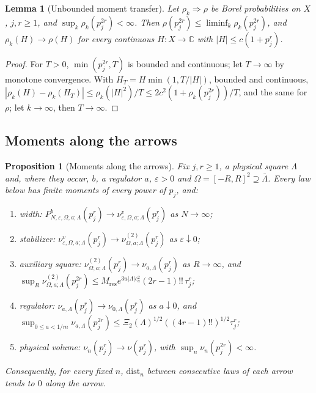 \documentclass[11pt]{article}
\theoremstyle{plain}
\newtheorem{proposition}[theorem]{Proposition}
\newtheorem{lemma}[theorem]{Lemma}
\theoremstyle{definition}
\theoremstyle{remark}
\newcommand{\C}{\mathbb{C}}
\newcommand{\dist}{\mathrm{dist}}
\begin{document}
\begin{lemma}[Unbounded moment transfer]\label{lem:transfer}
Let $\rho_k\Rightarrow\rho$ be Borel probabilities on $X$, $j,r\ge1$, and
$\sup_k\rho_k(p_j^{2r})<\infty$. Then $\rho(p_j^{2r})\le\liminf_k\rho_k(p_j^{2r})$, and
$\rho_k(H)\to\rho(H)$ for every continuous $H:X\to\C$ with $|H|\le c(1+p_j^{r})$.
\end{lemma}

\begin{proof}
For $T>0$, $\min(p_j^{2r},T)$ is bounded and continuous; let $T\to\infty$ by monotone
convergence. With $H_T=H\min(1,T/|H|)$, bounded and continuous,
$|\rho_k(H)-\rho_k(H_T)|\le\rho_k(|H|^{2})/T\le2c^{2}(1+\rho_k(p_j^{2r}))/T$, and the same for $\rho$; let
$k\to\infty$, then $T\to\infty$.
\end{proof}

\subsection{Moments along the arrows}

\begin{proposition}[Moments along the arrows]\label{prop:H1arrows}
Fix $j,r\ge1$, a physical square $\Lambda$ and, where they occur, $b$, a regulator $a$,
$\varepsilon>0$ and $\Omega=[-R,R]^{2}\supseteq\bar\Lambda$. Every law below has finite moments of
every power of $p_j$, and:
\begin{enumerate}[label=(\roman*)]
\item \emph{width:} $P^{b}_{N,\varepsilon,\Omega,a;\Lambda}(p_j^{r})\to\nu^{v}_{\varepsilon,\Omega,a;\Lambda}(p_j^{r})$ as $N\to\infty$;
\item \emph{stabilizer:} $\nu^{v}_{\varepsilon,\Omega,a;\Lambda}(p_j^{r})\to\nu^{(2)}_{\Omega,a;\Lambda}(p_j^{r})$ as $\varepsilon\downarrow0$;
\item \emph{auxiliary square:} $\nu^{(2)}_{\Omega,a;\Lambda}(p_j^{r})\to\nu_{a,\Lambda}(p_j^{r})$ as $R\to\infty$, and
  $\sup_R\nu^{(2)}_{\Omega,a;\Lambda}(p_j^{2r})\le M_{\mathrm{res}}e^{3u|\Lambda|c_a^{2}}(2r-1)!!\,\tau_j^{r}$;
\item \emph{regulator:} $\nu_{a,\Lambda}(p_j^{r})\to\nu_{0,\Lambda}(p_j^{r})$ as $a\downarrow0$, and
  $\sup_{0\le a<1/m}\nu_{a,\Lambda}(p_j^{2r})\le\Xi_2(\Lambda)^{1/2}((4r-1)!!)^{1/2}\tau_j^{r}$;
\item \emph{physical volume:} $\nu_n(p_j^{r})\to\nu(p_j^{r})$, with $\sup_n\nu_n(p_j^{2r})<\infty$.
\end{enumerate}
Consequently, for every fixed $n$, $\dist_n$ between consecutive laws of each
arrow tends to $0$ along the arrow.
\end{proposition}
\end{document}
